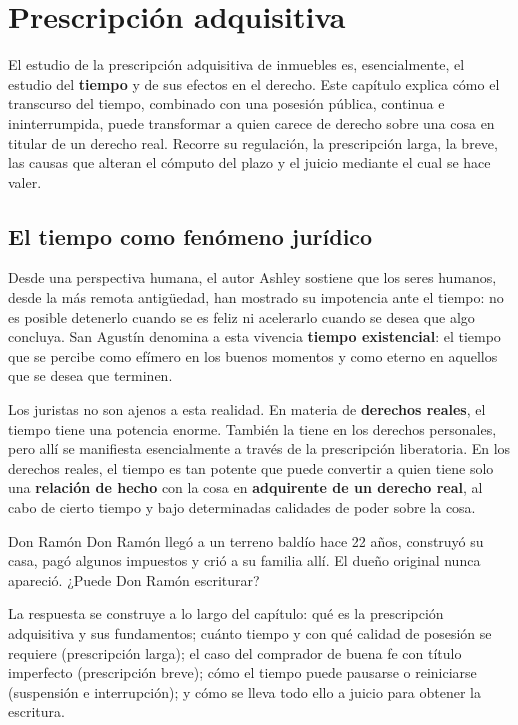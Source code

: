 \documentclass[12pt,oneside]{book}
\begin{document}
\chapter{Prescripción adquisitiva}\label{cap:prescripcion}

El estudio de la prescripción adquisitiva de inmuebles es, esencialmente, el estudio del \textbf{tiempo} y de sus efectos en el derecho. Este capítulo explica cómo el transcurso del tiempo, combinado con una posesión pública, continua e ininterrumpida, puede transformar a quien carece de derecho sobre una cosa en titular de un derecho real. Recorre su regulación, la prescripción larga, la breve, las causas que alteran el cómputo del plazo y el juicio mediante el cual se hace valer.

\section{El tiempo como fenómeno jurídico}

Desde una perspectiva humana, el autor Ashley sostiene que los seres humanos, desde la más remota antigüedad, han mostrado su impotencia ante el tiempo: no es posible detenerlo cuando se es feliz ni acelerarlo cuando se desea que algo concluya. San Agustín denomina a esta vivencia \textbf{tiempo existencial}: el tiempo que se percibe como efímero en los buenos momentos y como eterno en aquellos que se desea que terminen.

Los juristas no son ajenos a esta realidad. En materia de \textbf{derechos reales}, el tiempo tiene una potencia enorme. También la tiene en los derechos personales, pero allí se manifiesta esencialmente a través de la prescripción liberatoria. En los derechos reales, el tiempo es tan potente que puede convertir a quien tiene solo una \textbf{relación de hecho} con la cosa en \textbf{adquirente de un derecho real}, al cabo de cierto tiempo y bajo determinadas calidades de poder sobre la cosa.

\begin{example}{Don Ramón}
Don Ramón llegó a un terreno baldío hace 22 años, construyó su casa, pagó algunos impuestos y crió a su familia allí. El dueño original nunca apareció. ¿Puede Don Ramón escriturar?

La respuesta se construye a lo largo del capítulo: qué es la prescripción adquisitiva y sus fundamentos; cuánto tiempo y con qué calidad de posesión se requiere (prescripción larga); el caso del comprador de buena fe con título imperfecto (prescripción breve); cómo el tiempo puede pausarse o reiniciarse (suspensión e interrupción); y cómo se lleva todo ello a juicio para obtener la escritura.
\end{example}
\end{document}
